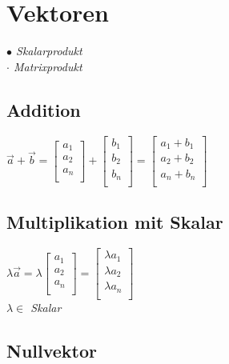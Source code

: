 \section{Vektoren}

\textit{$\bullet$ Skalarprodukt} \\
\textit{$\cdot$ Matrixprodukt}

\subsection{Addition}

$\vec{a} + \vec{b} = \begin{bmatrix}
    a_1 \\
    a_2 \\
    a_n \\
\end{bmatrix} + \begin{bmatrix}
    b_1 \\
    b_2 \\
    b_n \\
\end{bmatrix} = \begin{bmatrix}
    a_1 + b_1 \\
    a_2 + b_2 \\
    a_n + b_n \\
\end{bmatrix}$

\subsection{Multiplikation mit Skalar}

$\lambda \vec{a} = \lambda\begin{bmatrix}
    a_1 \\
    a_2 \\
    a_n \\
\end{bmatrix} = \begin{bmatrix}
    \lambda a_1 \\
    \lambda a_2 \\
    \lambda a_n \\
\end{bmatrix}$ \\

\textit{$\lambda \in$ Skalar}

\subsection{Nullvektor}

